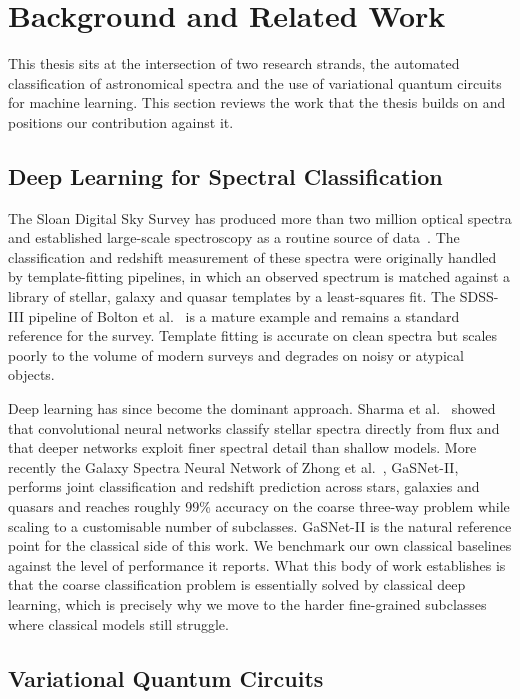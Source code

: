 \section{Background and Related Work}
\label{sec:related}

This thesis sits at the intersection of two research strands, the automated
classification of astronomical spectra and the use of variational quantum circuits
for machine learning. This section reviews the work that the thesis builds on and
positions our contribution against it.

\subsection{Deep Learning for Spectral Classification}
\label{sec:rel_spectra}

The Sloan Digital Sky Survey has produced more than two million optical spectra and
established large-scale spectroscopy as a routine source of
data~\cite{york2000sdss}. The classification and redshift measurement of these
spectra were originally handled by template-fitting pipelines, in which an observed
spectrum is matched against a library of stellar, galaxy and quasar templates by a
least-squares fit. The SDSS-III pipeline of Bolton et al.~\cite{bolton2012boss} is a
mature example and remains a standard reference for the survey. Template fitting is
accurate on clean spectra but scales poorly to the volume of modern surveys and
degrades on noisy or atypical objects.

Deep learning has since become the dominant approach. Sharma et
al.~\cite{sharma2020cnn} showed that convolutional neural networks classify stellar
spectra directly from flux and that deeper networks exploit finer spectral detail
than shallow models. More recently the Galaxy Spectra Neural Network of Zhong et
al.~\cite{zhong2024gasnet}, GaSNet-II, performs joint classification and redshift
prediction across stars, galaxies and quasars and reaches roughly 99\% accuracy on
the coarse three-way problem while scaling to a customisable number of subclasses.
GaSNet-II is the natural reference point for the classical side of this work. We
benchmark our own classical baselines against the level of performance it reports.
What this body of work establishes is that the coarse classification problem is
essentially solved by classical deep learning, which is precisely why we move to the
harder fine-grained subclasses where classical models still struggle.

\subsection{Variational Quantum Circuits}
\label{sec:rel_vqc}

